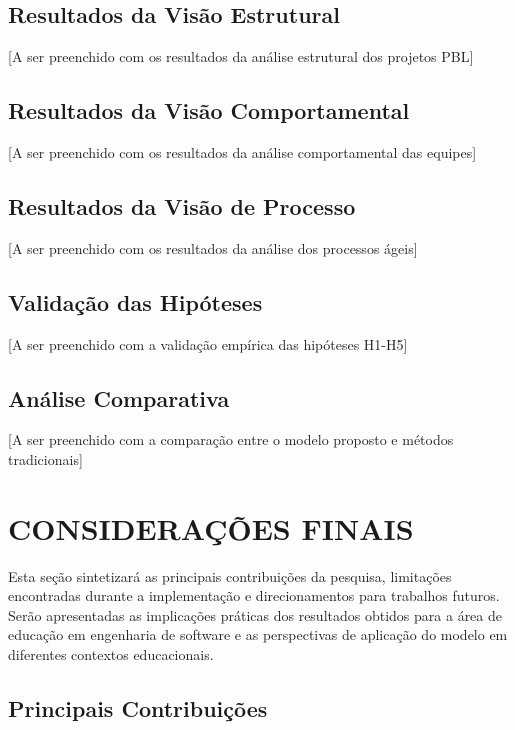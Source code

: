 \documentclass[12pt, a4paper, oneside, brazilian]{abntex2}
\begin{document}
\subsection{Resultados da Visão Estrutural}

[A ser preenchido com os resultados da análise estrutural dos projetos PBL]

\subsection{Resultados da Visão Comportamental}

[A ser preenchido com os resultados da análise comportamental das equipes]

\subsection{Resultados da Visão de Processo}

[A ser preenchido com os resultados da análise dos processos ágeis]

\subsection{Validação das Hipóteses}

[A ser preenchido com a validação empírica das hipóteses H1-H5]

\subsection{Análise Comparativa}

[A ser preenchido com a comparação entre o modelo proposto e métodos tradicionais]

\section{CONSIDERAÇÕES FINAIS}

Esta seção sintetizará as principais contribuições da pesquisa, limitações encontradas durante a implementação e direcionamentos para trabalhos futuros. Serão apresentadas as implicações práticas dos resultados obtidos para a área de educação em engenharia de software e as perspectivas de aplicação do modelo em diferentes contextos educacionais.

\subsection{Principais Contribuições}
\end{document}
